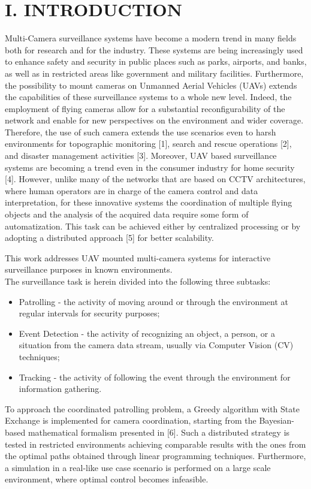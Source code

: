 \documentclass[conference]{IEEEtran}
\begin{document}
\section*{I. INTRODUCTION}
Multi-Camera surveillance systems have become a modern trend in many fields both for research and for the industry. These systems are being increasingly used to enhance safety and security in public places such as parks, airports, and banks, as well as in restricted areas like government and military facilities. Furthermore, the possibility to mount cameras on Unmanned Aerial Vehicles (UAVs) extends the capabilities of these surveillance systems to a whole new level. Indeed, the employment of flying cameras allow for a substantial reconfigurability of the network and enable for new perspectives on the environment and wider coverage. Therefore, the use of such camera extends the use scenarios even to harsh environments for topographic monitoring [1], search and rescue operations [2], and disaster management activities [3]. Moreover, UAV based surveillance systems are becoming a trend even in the consumer industry for home security [4]. However, unlike many of the networks that are based on CCTV architectures, where human operators are in charge of the camera control and data interpretation, for these innovative systems the coordination of multiple flying objects and the analysis of the acquired data require some form of automatization. This task can be achieved either by centralized processing or by adopting a distributed approach [5] for better scalability.

This work addresses UAV mounted multi-camera systems for interactive surveillance purposes in known environments.\\
The surveillance task is herein divided into the following three subtasks:

\begin{itemize}
  \item Patrolling - the activity of moving around or through the environment at regular intervals for security purposes;
  \item Event Detection - the activity of recognizing an object, a person, or a situation from the camera data stream, usually via Computer Vision (CV) techniques;
  \item Tracking - the activity of following the event through the environment for information gathering.
\end{itemize}

To approach the coordinated patrolling problem, a Greedy algorithm with State Exchange is implemented for camera coordination, starting from the Bayesian-based mathematical formalism presented in [6]. Such a distributed strategy is tested in restricted environments achieving comparable results with the ones from the optimal paths obtained through linear programming techniques. Furthermore, a simulation in a real-like use case scenario is performed on a large scale environment, where optimal control becomes infeasible.
\end{document}
